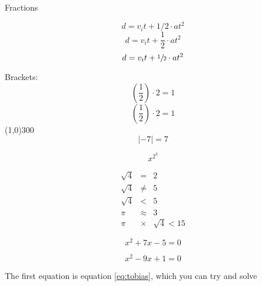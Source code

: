 \documentclass{article}
\begin{document}
Fractions

$$d = v_it + 1/2 \cdot at^2$$
$$d = v_it + \frac{1}{2} \cdot at^2$$
$$d = v_it + \sfrac{1}{2} \cdot at^2$$

Brackets:
$$(\frac{1}{2}) \cdot 2 = 1$$
$$\left(\frac{1}{2}\right) \cdot 2 = 1$$ 
\centering
\line(1,0){300}
$$\left|-7 \right| = 7$$

$$x^{2^3}$$


\begin{eqnarray*}
    \sqrt{4} &=& 2 \\
    \sqrt{4} &\neq& 5 \\ 
    \sqrt{4} &<& 5 \\
    \pi &\approx& 3 \\
    \pi &\times& \sqrt{4} < 15
\end{eqnarray*}

\begin{equation} \label{eq:tobias}
x^2 + 7x - 5 = 0
\end{equation}

\begin{equation}\label{eq:second}
x^2 - 9x + 1 = 0
\end{equation}

The first equation is equation \ref{eq:tobias}, which you can try and solve
\end{document}
